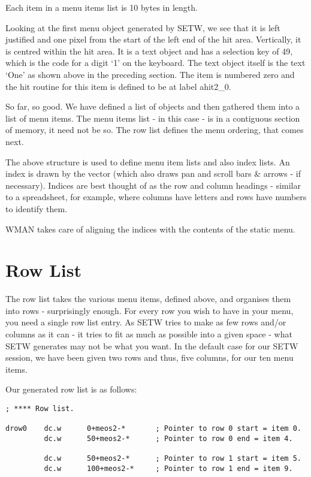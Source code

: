  


Each item in a menu items list is 10 bytes in length.

Looking at the first menu object generated by
 SETW, we see that it is left justified and one
    pixel from the start of the left end of the hit area. Vertically, it is
    centred within the hit area. It is a text object and has a selection key
    of 49, which is the code for a digit `1' on the keyboard. The text object
    itself is the text `One' as shown above in the preceding section. The item
    is numbered zero and the hit routine for this item is defined to be at
    label ahit2\_0.

So far, so good. We have defined a list of objects and then gathered
    them into a list of menu items. The menu items list -{} in this case -{} is in
    a contiguous section of memory, it need not be so. The row list defines
    the menu ordering, that comes next.

The above structure is used to define menu item lists and also index
    lists. An index is drawn by the  vector (which also draws pan and
    scroll bars \& arrows -{} if necessary). Indices are best thought of as
    the row and column headings -{} similar to a spreadsheet, for example, where
    columns have letters and rows have numbers to identify them.

WMAN takes
    care of aligning the indices with the contents of the static menu.

\section{Row List}
\label{ch29-app-menu-row-list}%

The row list takes the various menu items, defined above, and
    organises them into rows -{} surprisingly enough. For every row you wish to
    have in your menu, you need a single row list entry. As SETW tries to make
    as few rows and/or columns as it can -{} it tries to fit as much as possible
    into a given space -{} what SETW generates may not be what you want. In the
    default case for our SETW session, we have been given two rows and thus,
    five columns, for our ten menu items.

Our generated row list is as follows:

\begin{lstlisting}[firstnumber=last,caption={AppMenuTest1Win\_asm - Row List}]
; **** Row list.

drow0    dc.w      0+meos2-*       ; Pointer to row 0 start = item 0.
         dc.w      50+meos2-*      ; Pointer to row 0 end = item 4.

         dc.w      50+meos2-*      ; Pointer to row 1 start = item 5.
         dc.w      100+meos2-*     ; Pointer to row 1 end = item 9.
\end{lstlisting}

